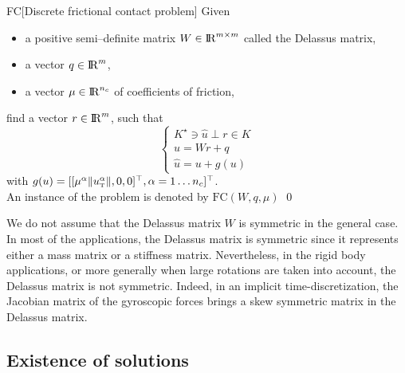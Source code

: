 {%
\begin{problemenv}{FC}[Discrete frictional contact problem]\label{prob:II}
  Given
  \begin{itemize}
    \item a positive semi--definite  matrix ${W} \in \mathrm{I\!R}^{m \times m}$ called the Delassus matrix,
    \item a vector $ {q} \in \mathrm{I\!R}^m$,
    \item a vector $\mu \in \mathrm{I\!R}^{n_c}$ of coefficients of friction, 
  \end{itemize}
find  a vector $r\in \mathrm{I\!R}^m$, such that
\begin{equation}\label{eq:soccp2}
  \begin{cases}
   K^\star \ni {\hat u} \perp r \in K \\[2mm]
    u =Wr +q \\[2mm]
    \hat u =u + g(u)
  \end{cases}
\end{equation}
with $g(u) = [[\mu^\alpha  \|u^\alpha_{\hbox{\tiny{T}}}\|, 0, 0 ]^\top, \alpha = 1\ldots n_c]^\top$. \\
An instance of the problem is denoted by $\mathrm{FC}(W,q,\mu)$
\qed
\end{problemenv}
%

\begin{remark}
  \label{Re:symmetry}
  We do not assume that the Delassus matrix $W$ is symmetric in the general case. In most of the applications, the Delassus matrix is symmetric since it represents either a mass matrix or a stiffness matrix. Nevertheless, in the rigid body applications, or more generally when large rotations are taken into account, the Delassus matrix is not symmetric. Indeed, in an implicit time-discretization, the Jacobian matrix of the gyroscopic forces brings a skew symmetric matrix in the Delassus matrix. 
\end{remark}

%




\subsection{Existence of solutions}
\label{sec:existence}

}
